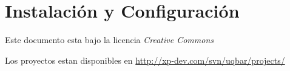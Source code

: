 \section{Instalación y Configuración}
Este documento esta bajo la licencia \emph{Creative Commons}

Los proyectos estan disponibles en \url{http://xp-dev.com/svn/uqbar/projects/}



